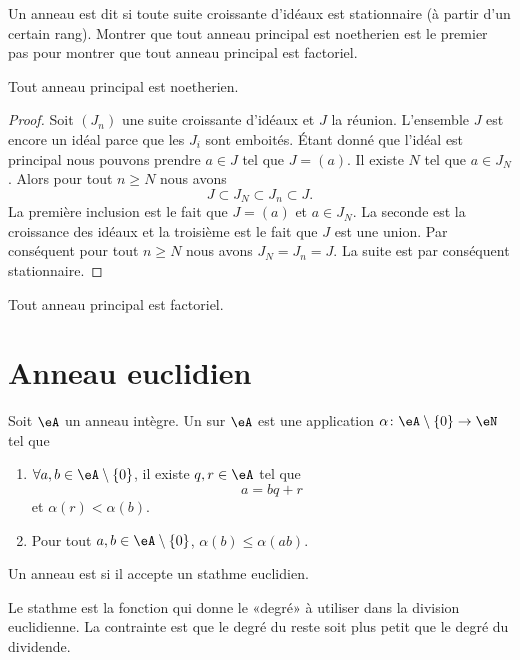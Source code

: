 Un anneau est dit  si toute suite croissante d'idéaux est stationnaire (à partir d'un certain rang). Montrer que tout anneau principal est noetherien est le premier pas pour montrer que tout anneau principal est factoriel.

\begin{lemma}
    Tout anneau principal est noetherien.
\end{lemma}

\begin{proof}
    Soit \( (J_n)\) une suite croissante d'idéaux et \( J\) la réunion. L'ensemble \( J\) est encore un idéal parce que les \( J_i\) sont emboités. Étant donné que l'idéal est principal nous pouvons prendre \( a\in J\) tel que \( J=(a)\). Il existe \( N\) tel que \( a\in J_N\). Alors pour tout \( n\geq N\) nous avons
    \begin{equation}
        J\subset J_N\subset J_n\subset J.
    \end{equation}
    La première inclusion est le fait que \( J=(a)\) et \( a\in J_N\). La seconde est la croissance des idéaux et la troisième est le fait que \( J\) est une union. Par conséquent pour tout \( n\geq N\) nous avons \( J_N=J_n=J\). La suite est par conséquent stationnaire.
\end{proof}

\begin{theorem}
    Tout anneau principal est factoriel.
\end{theorem}

\section{Anneau euclidien}

\begin{definition} \label{DefAXitWRL}
    Soit \( \eA\) un anneau intègre. Un  sur \( \eA\) est une application \( \alpha\colon \eA\setminus\{ 0 \}\to \eN\) tel que
    \begin{enumerate}
        \item
            \( \forall a,b\in \eA\setminus\{ 0 \}\), il existe \( q,r\in \eA\) tel que
            \begin{equation}
                a=bq+r
            \end{equation}
            et \( \alpha(r)<\alpha(b)\).
        \item
            Pour tout \( a,b\in \eA\setminus\{ 0 \}\), \( \alpha(b)\leq \alpha(ab)\).
    \end{enumerate}
    Un anneau est  si il accepte un stathme euclidien.
\end{definition}
Le stathme est la fonction qui donne le «degré» à utiliser dans la division euclidienne. La contrainte est que le degré du reste soit plus petit que le degré du dividende.

